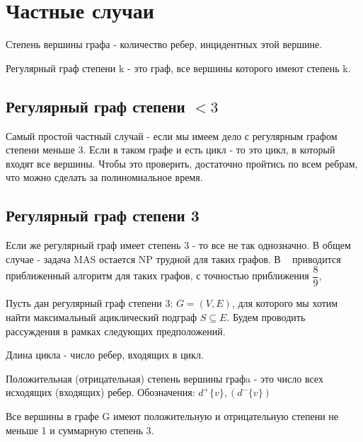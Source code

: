 
\section{Частные случаи}

\begin{definition}
    Степень вершины графа - количество ребер, инцидентных этой вершине.
\end{definition}

\begin{definition}
    Регулярный граф степени k - это граф, все вершины которого имеют степень k.
\end{definition}

\subsection{Регулярный граф степени $< 3$}

Самый простой частный случай - если мы имеем дело с регулярным графом
степени меньше 3.
Если в таком графе и есть цикл - то это цикл, в который входят все вершины.
Чтобы это проверить, достаточно пройтись по всем ребрам, что можно сделать 
за полиномиальное время.

\subsection{Регулярный граф степени 3}

Если же регулярный граф имеет степень 3 - то все не так однозначно.
В общем случае - задача MAS остается NP трудной для таких графов. В 
~\cite{digraph_3} приводится приближенный алгоритм для таких графов,
с точностью приближения $\dfrac{8}{9}$,

Пусть дан регулярный граф степени 3: $G=(V, E)$, для которого мы хотим найти
максимальный ациклический подграф $S \subseteq E$. Будем проводить рассуждения
в рамках следующих предположений.

\begin{definition}
    Длина цикла - число ребер, входящих в цикл.
\end{definition}

\begin{definition}
    Положительная (отрицательная) степень вершины графa - это число всех исходящих 
    (входящих) ребер. Обозначения: $d^+\{v\}, (d^-\{v\})$ 
\end{definition}

\begin{assumption}\label{asump1}
    Все вершины в графе G имеют положительную и отрицательную степени не меньше
    1 и суммарную степень 3.
\end{assumption}

